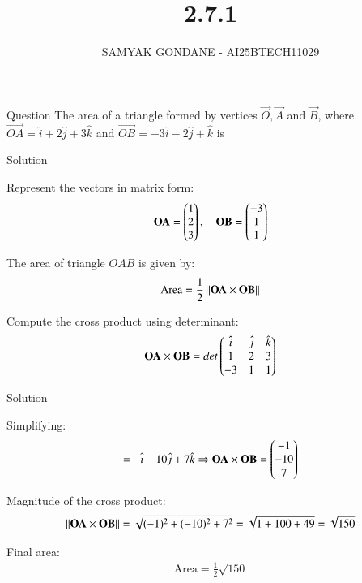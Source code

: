 \documentclass{beamer}
\title 
{2.7.1}
\date{}
\author
{SAMYAK GONDANE - AI25BTECH11029}
\begin{document}
\frame{\titlepage}

\begin{frame}{Question}
The area of a triangle formed by vertices $\vec{O}, \vec{A}$ and $\vec{B}$, where $\vec{OA} = \hat{i} + 2\hat{j} + 3\hat{k}$ and $\vec{OB} = -3\hat{i} - 2\hat{j} + \hat{k}$ is
\end{frame}

\begin{frame}{Solution}

Represent the vectors in matrix form:
\begin{align}
\mathbf{OA} = \begin{pmatrix}1 \\ 2 \\ 3\end{pmatrix}, \quad
\mathbf{OB} = \begin{pmatrix}-3 \\ 1 \\ 1\end{pmatrix}
\end{align}

The area of triangle $OAB$ is given by:
\begin{align}
\text{Area} = \frac{1}{2} \left\lVert\mathbf{OA} \times \mathbf{OB}\right\rVert
\end{align}

Compute the cross product using determinant:
\begin{align}
\mathbf{OA} \times \mathbf{OB} =
det\begin{pmatrix}
\hat{i} & \hat{j} & \hat{k} \\
1 & 2 & 3 \\
-3 & 1 & 1
\end{pmatrix}
\end{align}

\end{frame}

\begin{frame}{Solution}

Simplifying:
\begin{align}
= -\hat{i} - 10\hat{j} + 7\hat{k}
\Rightarrow \mathbf{OA} \times \mathbf{OB} = \begin{pmatrix}-1 \\ -10 \\ 7\end{pmatrix}
\end{align}

Magnitude of the cross product:
\begin{align}
\left\lVert\mathbf{OA} \times \mathbf{OB}\right\rVert = \sqrt{(-1)^2 + (-10)^2 + 7^2} = \sqrt{1 + 100 + 49} = \sqrt{150}
\end{align}

Final area:
\begin{align}
\text{Area} = \frac{1}{2} \sqrt{150}
\end{align}

\end{frame}
\end{document}
